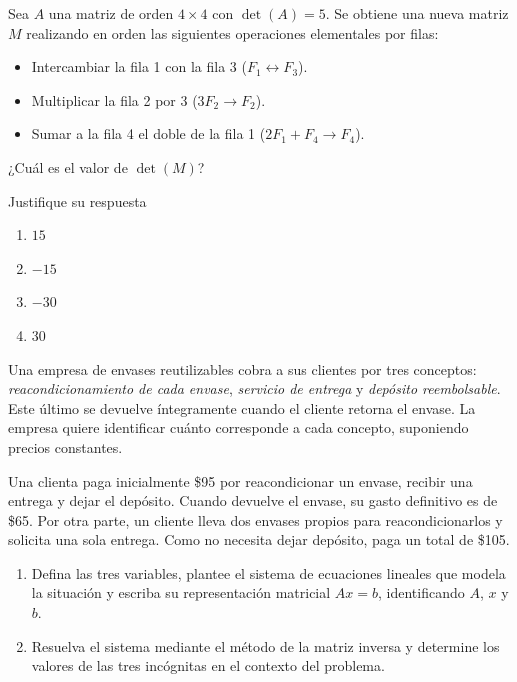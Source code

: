 \documentclass[10pt,a4]{examenEPN0}
\begin{document}
\encabezado
{}
\indicacionesPrueba
\begin{preguntas}
\item Sea $A$ una matriz de orden $4 \times 4$ con $\det(A) = 5$. Se obtiene una nueva matriz $M$ realizando en orden las siguientes operaciones elementales por filas: 
    \begin{itemize}
        \item Intercambiar la fila 1 con la fila 3 ($F_1 \leftrightarrow F_3$).
        \item Multiplicar la fila 2 por $3$ ($3F_2 \to F_2$).
        \item Sumar a la fila 4 el doble de la fila 1 ($ 2F_1 +F_4  \to F_4$).
    \end{itemize}
    ¿Cuál es el valor de $\det(M)$?

    Justifique su respuesta 
    \begin{enumerate}[label=(\alph*), itemsep=2pt]
        \item $15$
        \item $-15$
        \item $-30$
        \item $30$
    \end{enumerate}   
    \newpage

\item Una empresa de envases reutilizables cobra a sus clientes por tres conceptos: \emph{reacondicionamiento de cada envase}, \emph{servicio de entrega} y \emph{depósito reembolsable}. Este último se devuelve íntegramente cuando el cliente retorna el envase. La empresa quiere identificar cuánto corresponde a cada concepto, suponiendo precios constantes.

Una clienta paga inicialmente {\$95} por reacondicionar un envase, recibir una entrega y dejar el depósito. Cuando devuelve el envase, su gasto definitivo es de {\$65}. Por otra parte, un cliente lleva {dos envases propios} para reacondicionarlos y solicita {una sola entrega}. Como no necesita dejar depósito, paga un total de {\$105}.

\begin{enumerate}
\item Defina las tres variables, plantee el sistema de ecuaciones lineales que modela la situación y escriba su representación matricial $Ax=b$, identificando $A$, $x$ y $b$. 
\item Resuelva el sistema mediante el método de la matriz inversa y determine los valores de las tres incógnitas en el contexto del problema. 
\end{enumerate}


\end{preguntas}
\end{document}
